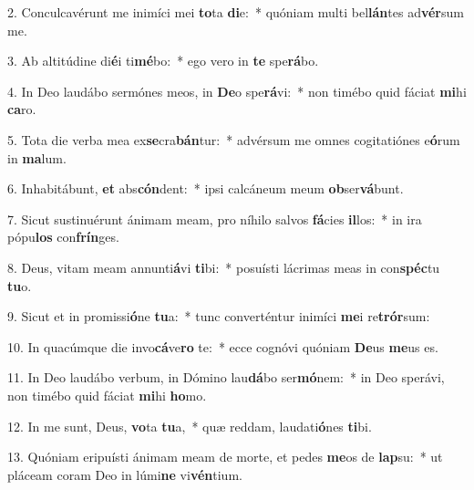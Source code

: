 2. Conculcavérunt me inimíci mei \textbf{to}ta \textbf{di}e:~*  quóniam multi bel\textbf{lán}tes ad\textbf{vér}sum me.\

3. Ab altitúdine di\textbf{é}i ti\textbf{mé}bo:~*  ego vero in \textbf{te} spe\textbf{rá}bo.\

4. In Deo laudábo sermónes meos, in \textbf{De}o spe\textbf{rá}vi:~*  non timébo quid fáciat \textbf{mi}hi \textbf{ca}ro.\

5. Tota die verba mea ex\textbf{se}cra\textbf{bán}tur:~*  advérsum me omnes cogitatiónes e\textbf{ó}rum in \textbf{ma}lum.\

6. Inhabitábunt, \textbf{et} abs\textbf{cón}dent:~*  ipsi calcáneum meum \textbf{ob}ser\textbf{vá}bunt.\

7. Sicut sustinuérunt ánimam meam, pro níhilo salvos \textbf{fá}cies \textbf{il}los:~*  in ira pópu\textbf{los} con\textbf{frín}ges.\

8. Deus, vitam meam annunti\textbf{á}vi \textbf{ti}bi:~*  posuísti lácrimas meas in con\textbf{spéc}tu \textbf{tu}o.\

9. Sicut et in promissi\textbf{ó}ne \textbf{tu}a:~*  tunc converténtur inimíci \textbf{me}i re\textbf{trór}sum:\

10. In quacúmque die invo\textbf{cá}ve\textbf{ro} te:~*  ecce cognóvi quóniam \textbf{De}us \textbf{me}us es.\

11. In Deo laudábo verbum, in Dómino lau\textbf{dá}bo ser\textbf{mó}nem:~*  in Deo sperávi, non timébo quid fáciat \textbf{mi}hi \textbf{ho}mo.\

12. In me sunt, Deus, \textbf{vo}ta \textbf{tu}a,~*  quæ reddam, laudati\textbf{ó}nes \textbf{ti}bi.\

13. Quóniam eripuísti ánimam meam de morte, et pedes \textbf{me}os de \textbf{lap}su:~*  ut pláceam coram Deo in lúmi\textbf{ne} vi\textbf{vén}tium.\

